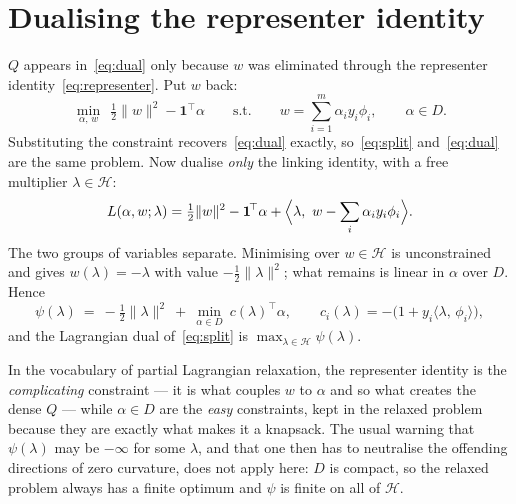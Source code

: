 \documentclass[11pt,a4paper]{report}
\newcommand{\Hs}{\mathcal{H}}
\newcommand{\one}{\mathbf{1}}
\newcommand{\inner}[2]{\langle #1,\, #2 \rangle}
\begin{document}
\section{Dualising the representer identity}
$Q$ appears in~\eqref{eq:dual} only because $w$ was eliminated through the
representer identity~\eqref{eq:representer}. Put $w$ back:
\begin{equation}
\label{eq:split}
\tag{D$'$}
\min_{\alpha,\,w}\ \ \tfrac12\|w\|^2-\one^{\!\top}\alpha
\qquad\text{s.t.}\qquad
w=\sum_{i=1}^m\alpha_iy_i\phi_i,
\qquad \alpha\in D .
\end{equation}
Substituting the constraint recovers~\eqref{eq:dual} exactly, so~\eqref{eq:split}
and~\eqref{eq:dual} are the same problem. Now dualise \emph{only} the linking
identity, with a free multiplier $\lambda\in\Hs$:
\[
L(\alpha,w;\lambda)=\tfrac12\|w\|^2-\one^{\!\top}\alpha
+\Bigl\langle \lambda,\ w-\sum_i\alpha_iy_i\phi_i \Bigr\rangle .
\]
The two groups of variables separate. Minimising over $w\in\Hs$ is unconstrained and
gives $w(\lambda)=-\lambda$ with value $-\tfrac12\|\lambda\|^2$; what remains is
linear in $\alpha$ over $D$. Hence
\begin{equation}
\label{eq:psi}
\boxed{\ \
\psi(\lambda)\ =\ -\tfrac12\|\lambda\|^2
\ +\ \min_{\alpha\in D}\ c(\lambda)^{\!\top}\alpha,
\qquad
c_i(\lambda)=-\bigl(1+y_i\inner{\lambda}{\phi_i}\bigr),
\ \ }
\end{equation}
and the Lagrangian dual of~\eqref{eq:split} is $\max_{\lambda\in\Hs}\psi(\lambda)$.

In the vocabulary of partial Lagrangian relaxation, the representer identity is the
\emph{complicating} constraint --- it is what couples $w$ to $\alpha$ and so what
creates the dense $Q$ --- while $\alpha\in D$ are the \emph{easy} constraints, kept
in the relaxed problem because they are exactly what makes it a knapsack. The usual
warning that $\psi(\lambda)$ may be $-\infty$ for some $\lambda$, and that one then
has to neutralise the offending directions of zero curvature, does not apply here:
$D$ is compact, so the relaxed problem always has a finite optimum and $\psi$ is
finite on all of $\Hs$.
\end{document}
